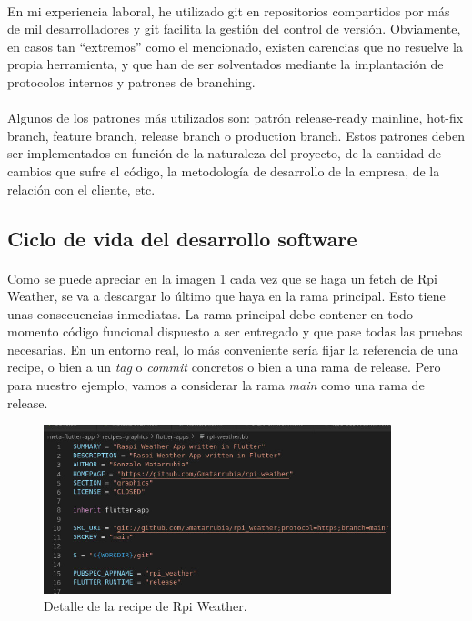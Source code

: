 \paragraph{}En mi experiencia laboral, he utilizado \gls{git} en repositorios compartidos
por más de mil desarrolladores y \gls{git} facilita la gestión del control de versión.
Obviamente, en casos tan ``extremos'' como el mencionado, existen carencias que no
resuelve la propia herramienta, y que han de ser solventados mediante la implantación
de protocolos internos y patrones de branching.

\paragraph{}Algunos de los patrones más utilizados son: patrón release-ready mainline,
hot-fix branch, feature branch, release branch o production branch. Estos patrones deben
ser implementados en función de la naturaleza del proyecto, de la cantidad de cambios que
sufre el código, la metodología de desarrollo de la empresa, de la relación con el
cliente, etc.

\subsection{Ciclo de vida del desarrollo software}

\paragraph{}Como se puede apreciar en la imagen \ref{imgs:recipe-rpi-weather-1} cada
vez que se haga un \gls{fetch} de Rpi Weather, se va a descargar lo último que haya en la
rama principal. Esto tiene unas consecuencias inmediatas. La rama principal debe contener
en todo momento código funcional dispuesto a ser entregado y que pase todas las pruebas
necesarias. En un entorno real, lo más conveniente sería fijar la referencia de una recipe,
o bien a un \emph{tag} o \emph{commit} concretos o bien a una rama de release. Pero para
nuestro ejemplo, vamos a considerar la rama \emph{main} como una rama de release.

\begin{figure}[H]
    \centering
    \includegraphics[width=0.90\textwidth]{imgs/rpi-weather-recipe}
    \caption[Detale recipe de Rpi Weahter]{Detalle de la recipe de Rpi Weather.}
    \label{imgs:recipe-rpi-weather-1}
\end{figure}

